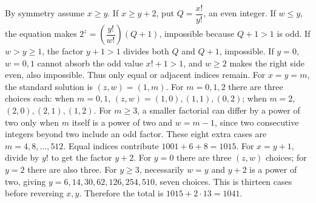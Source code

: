 By symmetry assume $x\ge y$. If $x\ge y+2$, put $Q=\dfrac{x!}{y!}$, an even integer. If $w\le y$, the equation makes $2^z=(\dfrac{y!}{w!})(Q+1)$, impossible because $Q+1>1$ is odd. If $w>y\ge1$, the factor $y+1>1$ divides both $Q$ and $Q+1$, impossible. If $y=0$, $w=0,1$ cannot absorb the odd value $x!+1>1$, and $w\ge2$ makes the right side even, also impossible. Thus only equal or adjacent indices remain.
For $x=y=m$, the standard solution is $(z,w)=(1,m)$. For $m=0,1,2$ there are three choices each: when $m=0,1$, $(z,w)=(1,0),(1,1),(0,2)$; when $m=2$, $(2,0),(2,1),(1,2)$. For $m\ge3$, a smaller factorial can differ by a power of two only when $m$ itself is a power of two and $w=m-1$, since two consecutive integers beyond two include an odd factor. These eight extra cases are $m=4,8,\ldots,512$. Equal indices contribute $1001+6+8=1015$.
For $x=y+1$, divide by $y!$ to get the factor $y+2$. For $y=0$ there are three $(z,w)$ choices; for $y=2$ there are also three. For $y\ge3$, necessarily $w=y$ and $y+2$ is a power of two, giving $y=6,14,30,62,126,254,510$, seven choices. This is thirteen cases before reversing $x,y$. Therefore the total is $\boxed{1015+2\cdot13=1041}$.
